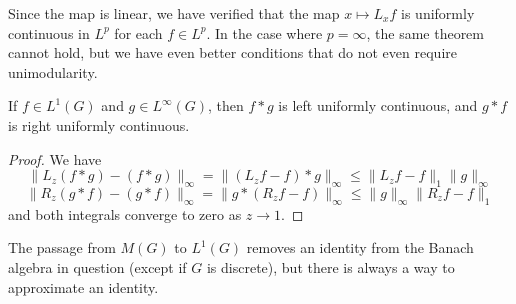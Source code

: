Since the map is linear, we have verified that the map $x \mapsto L_x f$ is uniformly continuous in $L^p$ for each $f \in L^p$. In the case where $p = \infty$, the same theorem cannot hold, but we have even better conditions that do not even require unimodularity.

\begin{theorem}
    If $f \in L^1(G)$ and $g \in L^\infty(G)$, then $f*g$ is left uniformly continuous, and $g*f$ is right uniformly continuous.
\end{theorem}
\begin{proof}
    We have
    \[ \| L_z (f*g) - (f*g) \|_\infty = \| (L_z f - f) * g \|_\infty \leq \| L_z f - f \|_1 \| g \|_\infty \]
    \[ \| R_z (g*f) - (g*f) \|_\infty = \| g * (R_z f - f) \|_\infty \leq \| g \|_\infty \| R_z f - f \|_1 \]
    and both integrals converge to zero as $z \to 1$.
\end{proof}

The passage from $M(G)$ to $L^1(G)$ removes an identity from the Banach algebra in question (except if $G$ is discrete), but there is always a way to approximate an identity.

